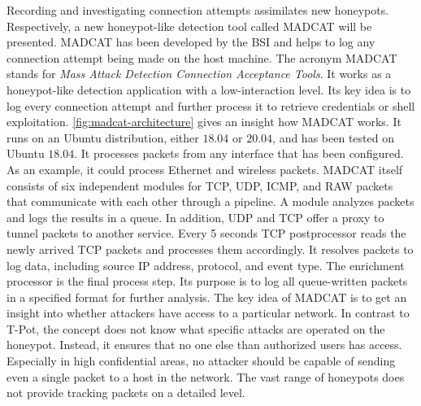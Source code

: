 Recording and investigating connection attempts assimilates new honeypots.
Respectively, a new honeypot-like detection tool called MADCAT will be presented.
MADCAT has been developed by the BSI and helps to log any connection attempt being made on the host machine.
The acronym MADCAT stands for \textit{Mass Attack Detection Connection Acceptance Tools}.
It works as a honeypot-like detection application with a low-interaction level.
Its key idea is to log every connection attempt and further process it to retrieve credentials or shell exploitation.
\autoref{fig:madcat-architecture} gives an insight how MADCAT works.
It runs on an Ubuntu distribution, either $18.04$ or $20.04$, and has been tested on Ubuntu $18.04$.
It processes packets from any interface that has been configured.
As an example, it could process Ethernet and wireless packets.
MADCAT itself consists of six independent modules for TCP, UDP, ICMP, and RAW packets that communicate with each other through a pipeline.
A module analyzes packets and logs the results in a queue.
In addition, UDP and TCP offer a proxy to tunnel packets to another service.
Every 5 seconds TCP postprocessor reads the newly arrived TCP packets and processes them accordingly.
It resolves packets to log data, including source IP address, protocol, and event type.
The enrichment processor is the final process step.
Its purpose is to log all queue-written packets in a specified format for further analysis.
The key idea of MADCAT is to get an insight into whether attackers have access to a particular network.
In contrast to T-Pot, the concept does not know what specific attacks are operated on the honeypot.
Instead, it ensures that no one else than authorized users has access.
Especially in high confidential areas, no attacker should be capable of sending even a single packet to a host in the network.
The vast range of honeypots does not provide tracking packets on a detailed level.

